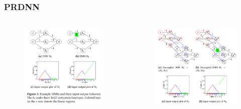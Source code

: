 \documentclass[aspectratio=169 %
,serif,mathserif]{beamer}
\begin{document}
\begin{frame}
	\frametitle{PRDNN}
	\begin{columns}
		\begin{column}{.38\textwidth}
			\begin{figure}[htbp]
				\includegraphics[width=\linewidth]{1.png}
			\end{figure}
		\end{column}

		\begin{column}{.65\textwidth}
			\begin{figure}[htbp]
				\includegraphics[width=.58\textwidth]{2.png}
			\end{figure}
		\end{column}
	\end{columns}
\end{frame}
\end{document}
